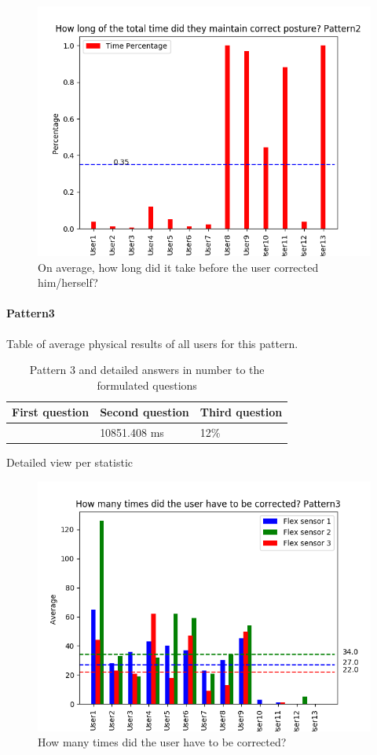 \documentclass[sigconf]{acmart}
\begin{document}
\begin{figure}[h]
\centering
\includegraphics[width=1\columnwidth, scale=1]{p2_q3.png}
\caption{On average, how long did it take before the user corrected him/herself?}
\end{figure}


\paragraph {Pattern3}
Table of average physical results of all users for this pattern.\\
\begin{table}[htb]
\caption{Pattern 3 and detailed answers in number to the formulated questions}
\label{my-label}
\begin{tabular}{|l|l|l|}
\hline
\multicolumn{1}{|c|}{\textbf{First question}} & \multicolumn{1}{c|}{\textbf{Second question}} & \multicolumn{1}{c|}{\textbf{Third question}} \\ \hline
 			[27.0, 34.0, 22.0]				  & 10851.408 ms 								  &   	12\%  							      \\ \hline
\end{tabular}
\end{table}

Detailed view per statistic
\begin{figure}[ht]
\centering
\includegraphics[width=0.8\columnwidth, scale=1]{p3_q1.png}
\caption{How many times did the user have to be corrected?}
\end{figure}
\end{document}
